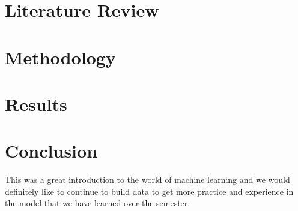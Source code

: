 \documentclass[conference]{IEEEtran}
\begin{document}
\section{Literature Review}
\section{Methodology}
\section{Results}

\section{Conclusion}
This was a great introduction to the world of machine learning and we would definitely like to continue to build data to get more practice and experience in the model that we have learned over the semester.
\end{document}
